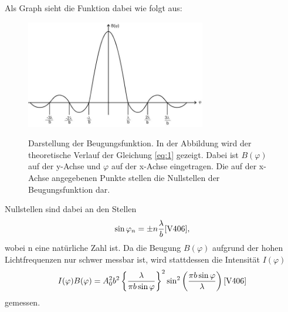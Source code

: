 Als Graph sieht die Funktion dabei wie folgt aus:
\begin{figure}[H]
    \centering
    \includegraphics[width=0.7\textwidth]{images/graph.jpg}
    \label{fig:2}
    \caption{Darstellung der Beugungsfunktion\cite{V406}.
    In der Abbildung wird der theoretische Verlauf der Gleichung \eqref{eq:1} gezeigt. 
    Dabei ist $B(\varphi)$ auf der y-Achse und $\varphi$ auf der x-Achse eingetragen.
    Die auf der x-Achse angegebenen Punkte stellen die Nullstellen der Beugungsfunktion dar.
    }
\end{figure}
\justifying Nullstellen sind dabei an den Stellen
\begin{align}
    \sin \varphi _n = \pm n \frac{\lambda}{b} \text{\cite{V406}} \label{eq:3},
\end{align}
wobei n eine natürliche Zahl ist.
Da die Beugung $B(\varphi)$ aufgrund der hohen Lichtfrequenzen nur schwer messbar ist,
wird stattdessen die Intensität $I(\varphi)$ 
\begin{align}
    I(\varphi)  B(\varphi) = A_0^2 b^2 \left\{\frac{\lambda}{\pi b \sin \varphi} \right\}^2 \sin ^2 \left(\frac{\pi b \sin \varphi}{\lambda} \right) \text{\cite{V406}} \label{eq:4}
\end{align}
gemessen.\\


